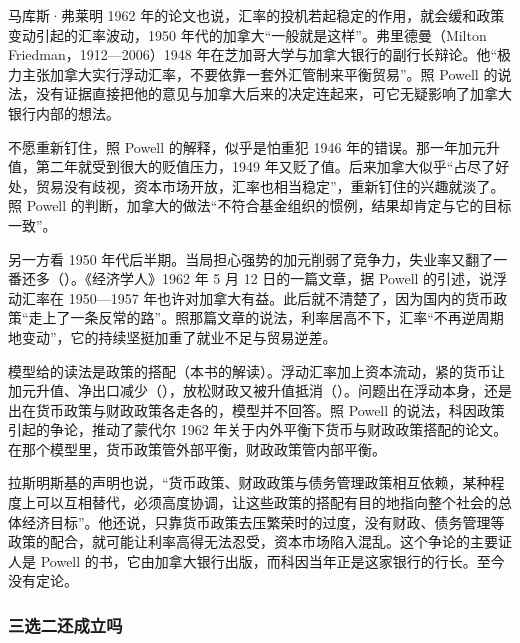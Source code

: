 马库斯·弗莱明 1962 年的论文也说，汇率的投机若起稳定的作用，就会缓和政策变动引起的汇率波动，1950 年代的加拿大“一般就是这样”\cite{fleming1962}。弗里德曼（Milton Friedman，1912—2006）1948 年在芝加哥大学与加拿大银行的副行长辩论\cite{powell2005,loc37}。他“极力主张加拿大实行浮动汇率，不要依靠一套外汇管制来平衡贸易”\cite{powell2005}。照 Powell 的说法，没有证据直接把他的意见与加拿大后来的决定连起来，可它无疑影响了加拿大银行内部的想法\cite{powell2005}。

不愿重新钉住，照 Powell 的解释，似乎是怕重犯 1946 年的错误。那一年加元升值，第二年就受到很大的贬值压力，1949 年又贬了值\cite{powell2005}。后来加拿大似乎“占尽了好处，贸易没有歧视，资本市场开放，汇率也相当稳定”，重新钉住的兴趣就淡了\cite{powell2005}。照 Powell 的判断，加拿大的做法“不符合基金组织的惯例，结果却肯定与它的目标一致”\cite{powell2005}。

另一方看 1950 年代后半期。当局担心强势的加元削弱了竞争力，失业率又翻了一番还多（）。《经济学人》1962 年 5 月 12 日的一篇文章，据 Powell 的引述，说浮动汇率在 1950—1957 年也许对加拿大有益\cite{powell2005}。此后就不清楚了，因为国内的货币政策“走上了一条反常的路”\cite{powell2005}。照那篇文章的说法，利率居高不下，汇率“不再逆周期地变动”，它的持续坚挺加重了就业不足与贸易逆差\cite{powell2005}。

模型给的读法是政策的搭配（本书的解读）。浮动汇率加上资本流动，紧的货币让加元升值、净出口减少（），放松财政又被升值抵消（）。问题出在浮动本身，还是出在货币政策与财政政策各走各的，模型并不回答。照 Powell 的说法，科因政策引起的争论，推动了蒙代尔 1962 年关于内外平衡下货币与财政政策搭配的论文\cite{powell2005}。在那个模型里，货币政策管外部平衡，财政政策管内部平衡\cite{nobel1999}。

拉斯明斯基的声明也说，“货币政策、财政政策与债务管理政策相互依赖，某种程度上可以互相替代，必须高度协调，让这些政策的搭配有目的地指向整个社会的总体经济目标”\cite{boc1961}。他还说，只靠货币政策去压繁荣时的过度，没有财政、债务管理等政策的配合，就可能让利率高得无法忍受，资本市场陷入混乱\cite{boc1961}。这个争论的主要证人是 Powell 的书，它由加拿大银行出版，而科因当年正是这家银行的行长。至今没有定论。

\subsubsection{三选二还成立吗}

